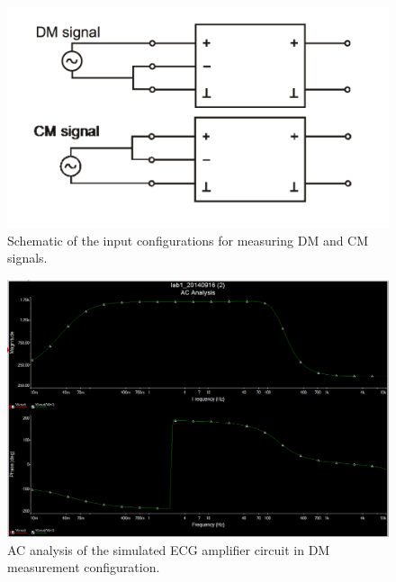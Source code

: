 \documentclass[pdftex,12pt,letterpaper]{article}
\begin{document}
\begin{figure}[H]
\begin{center}
\includegraphics[scale=.5]{DM_CM.png}
\caption{Schematic of the input configurations for measuring DM and CM signals.}
\label{fig:DM_CM}
\end{center}
\end{figure}

\begin{figure}[H]
\begin{center}
\includegraphics[scale=.35]{DM_analysis.png}
\caption{AC analysis of the simulated ECG amplifier circuit in DM measurement configuration.}
\label{fig:DM}
\end{center}
\end{figure}
\end{document}
